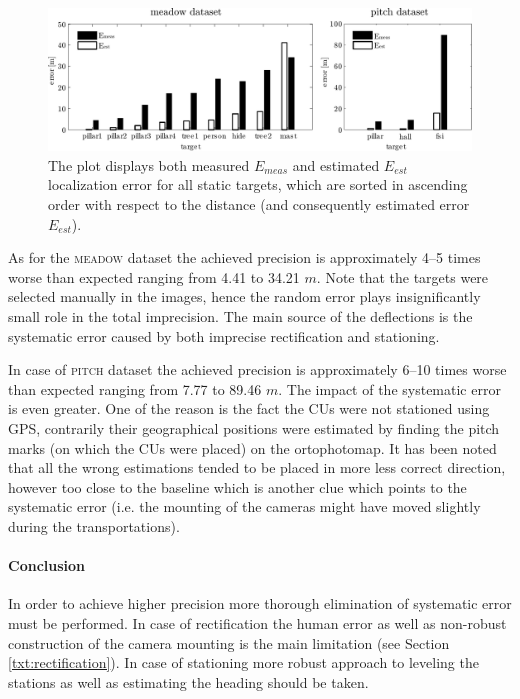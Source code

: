 \begin{figure}[htb]\centering
	\centering
	\includegraphics[width=0.98\linewidth]{fig/plot_static_targets.pdf}
	\caption{The plot displays both measured $E_{meas}$ and estimated $E_{est}$ localization error for all static targets, which are sorted in ascending order with respect to the distance (and consequently estimated error $E_{est}$).}
	\label{fig:plot_error_estatic_targets}
\end{figure}

As for the \textsc{meadow} dataset the achieved precision is approximately 4--5 times worse than expected ranging from 4.41 to 34.21 $m$. Note that the targets were selected manually in the images, hence the random error plays insignificantly small role in the total imprecision. The main source of the deflections is the systematic error caused by both imprecise rectification and stationing. 

In case of \textsc{pitch} dataset the achieved precision is approximately 6--10 times worse than expected ranging from 7.77 to 89.46 $m$. The impact of the systematic error is even greater. One of the reason is the fact the CUs were not stationed using GPS, contrarily their geographical positions were estimated by finding the pitch marks (on which the CUs were placed) on the ortophotomap. It has been noted that all the wrong estimations tended to be placed in more less correct direction, however too close to the baseline which is another clue which points to the systematic error (i.e. the mounting of the cameras might have moved slightly during the transportations).

\paragraph{Conclusion} In order to achieve higher precision more thorough elimination of systematic error must be performed. In case of rectification the human error as well as non-robust construction of the camera mounting is the main limitation (see Section \ref{txt:rectification}). In case of stationing more robust approach to leveling the stations as well as estimating the heading should be taken.

